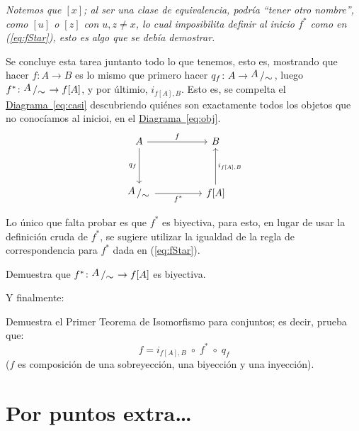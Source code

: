 \documentclass[letterpaper,DIV=14,headsepline,12pt]{scrartcl}
\newcommand{\pts}{}
\newenvironment{ejercicio}[1]{\ifthenelse{\equal{#1}{1} \OR
\equal{#1}{+1}}{\renewcommand{\pts}{\textbf{(#1
pt)}}}{\renewcommand{\pts}{\textbf{(#1 pts)}}}\begin{ejj}\upshape
\pts}{\end{ejj}}
\newcommand{\quot}[2]{{\raisebox{.2em}{$#1$}\left/\raisebox{-.2em}{$#2$}\right.}}
\begin{document}
    \textit{Notemos que $[x]$; al ser una clase de equivalencia, podría ``tener
    otro nombre'', como $[u]$ o $[z]$ con $u,z \neq x$, lo cual imposibilita
    definir al inicio $f^*$ como en (\ref{eq:fStar}), esto es algo que se debía
    demostrar.}

    Se concluye esta tarea juntanto todo lo que tenemos, esto es, mostrando que
    hacer $f\colon A\to B$ es lo mismo que primero hacer $q_f\colon A\to \quot{A}{\sim}$,
    luego $f^*\colon \quot{A}{\sim} \to f[A]$, y por últimio, $i_{f[A],B}$. Esto es,
    se compelta el \hyperref[eq:obj]{Diagrama~\ref*{eq:casi}} descubriendo
    quiénes son exactamente todos los objetos que no conocíamos al inicioi, en
    el \hyperref[eq:obj]{Diagrama~\ref*{eq:obj}}.
    \begin{equation}\label{eq:ya}
        \begin{tikzcd}
            A && B \\
            \\
            \quot{A}{\sim} && {f[A]}
            \arrow["f", from=1-1, to=1-3]
            \arrow["q_f"', from=1-1, to=3-1]
            \arrow["f^*"', from=3-1, to=3-3]
            \arrow["{i_{f[A],B}}"', from=3-3, to=1-3]
        \end{tikzcd}
    \end{equation}

    Lo único que falta probar es que $f^*$ es biyectiva, para esto, en lugar de
    usar la definición cruda de $f^*$, se sugiere utilizar la igualdad de la
    regla de correspondencia para $f^*$ dada en (\ref{eq:fStar}).

    \begin{ejercicio}{1}
        Demuestra que $f^*\colon \quot{A}{\sim} \to f[A]$ es biyectiva.
    \end{ejercicio}

    Y finalmente:
    \begin{ejercicio}{.5}
        Demuestra el Primer Teorema de Isomorfismo para conjuntos; es decir,
        prueba que:
        \[ f=i_{f[A],B} \; \circ \; f^* \; \circ \; q_f \] ($f$ es composición
        de una sobreyección, una biyección y una inyección).
    \end{ejercicio}

    \section*{Por puntos extra\dots}
\end{document}

